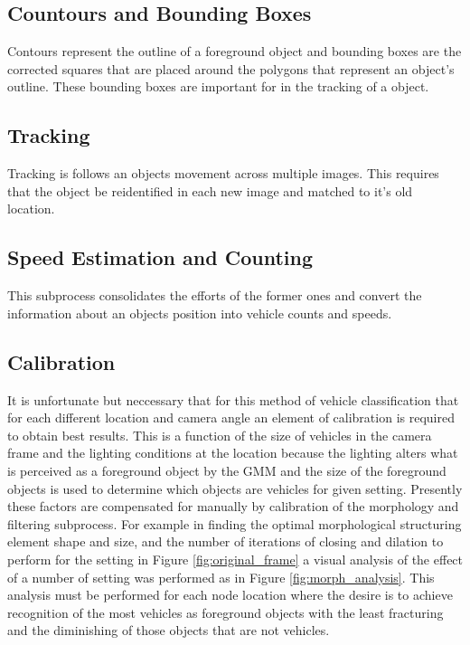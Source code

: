 \subsection{Countours and Bounding Boxes}

Contours represent the outline of a foreground object and bounding boxes are the corrected squares that are placed around the polygons that represent an object's outline. These bounding boxes are important for in the tracking of a object.


\subsection{Tracking}

Tracking is follows an objects movement across multiple images. This requires that the object be reidentified in each new image and matched to it's old location.

\subsection{Speed Estimation and Counting}

This subprocess consolidates the efforts of the former ones and convert the information about an objects position into vehicle counts and speeds.

\subsection{Calibration}

It is unfortunate but neccessary that for this method of vehicle classification that for each different location and camera angle an element of calibration is required to obtain best results. This is a function of the size of vehicles in the camera frame and the lighting conditions at the location because the lighting alters what is perceived as a foreground object by the GMM and the size of the foreground objects is used to determine which objects are vehicles for given setting. Presently these factors are compensated for manually by calibration of the morphology and filtering subprocess. For example in finding the optimal morphological structuring element shape and size, and the number of iterations of closing and dilation to perform for the setting in Figure \ref{fig:original_frame} a visual analysis of the effect of a number of setting was performed as in Figure \ref{fig:morph_analysis}. This analysis must be performed for each node location where the desire is to achieve recognition of the most vehicles as foreground objects with the least fracturing and the diminishing of those objects that are not vehicles.

